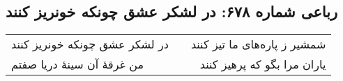 \begin{center}
\section*{رباعی شماره ۶۷۸: در لشکر عشق چونکه خونریز کنند}
\label{sec:0678}
\begin{longtable}{l p{0.5cm} r}
در لشکر عشق چونکه خونریز کنند
&&
شمشیر ز پاره‌های ما تیز کنند
\\
من غرقهٔ آن سینهٔ دریا صفتم
&&
یاران مرا بگو که پرهیز کنند
\\
\end{longtable}
\end{center}
